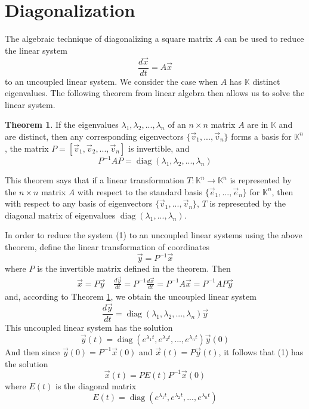 \documentclass[11pt]{book}
\theoremstyle{definition}\newtheorem{definition}[subsection]{Definition}
\theoremstyle{definition}\newtheorem{example}[subsection]{Example}
\theoremstyle{definition}\newtheorem{notation}[subsection]{Notation}
\theoremstyle{definition}\newtheorem{remark}[subsection]{Remark}
\theoremstyle{theorem}\newtheorem{theorem}[subsection]{Theorem}
\theoremstyle{theorem}\newtheorem{lemma}[subsection]{Lemma}
\theoremstyle{theorem}\newtheorem{proposition}[subsection]{Proposition}
\theoremstyle{theorem}\newtheorem{corollary}[subsection]{Corollary}
\theoremstyle{theorem}\newtheorem{case}{Case}
\theoremstyle{remark}\newtheorem{subcase}{Subcase}[case]
\newcommand{\K}{\mathbb{K}}
\DeclareMathOperator{\diag}{diag}
\begin{document}
\section{Diagonalization}

The algebraic technique of diagonalizing a square matrix $A$ can be used to reduce the linear system
\begin{equation*}
    \frac{d\vec{x}}{dt} = A\vec{x} \tag{1}
\end{equation*}
to an uncoupled linear system. We consider the case when $A$ has $\K$ distinct eigenvalues. The following theorem from linear algebra then allows us to solve the linear system.

\begin{theorem}\label{theorem:1.3.1}
    If the eigenvalues $\lambda_1, \lambda_2,..., \lambda_n$ of an $n \times n$ matrix $A$ are in $\K$ and are distinct, then any corresponding eigenvectors $\{\vec{v}_1,..., \vec{v}_n\}$ forms a basis for $\K^n$, the matrix $P = [\vec{v}_1, \vec{v}_2,..., \vec{v}_n]$ is invertible, and
    \begin{equation*}
        P^{-1}AP = \diag(\lambda_1, \lambda_2,..., \lambda_n)
    \end{equation*}
\end{theorem}

This theorem says that if a linear transformation $T : \K^n \to \K^n$ is represented by the $n \times n$ matrix $A$ with respect to the standard basis $\{\vec{e}_1,..., \vec{e}_n\}$ for $\K^n$, then with respect to any basis of eigenvectors $\{\vec{v}_1,..., \vec{v}_n\}$, $T$ is represented by the diagonal matrix of eigenvalues $\diag(\lambda_1,..., \lambda_n)$.

In order to reduce the system (1) to an uncoupled linear systems using the above theorem, define the linear transformation of coordinates
\begin{equation*}
    \vec{y} = P^{-1}\vec{x}
\end{equation*}
where $P$ is the invertible matrix defined in the theorem. Then
\begin{align*}
    \vec{x} = P\vec{y} \quad \frac{d\vec{y}}{dt} = P^{-1}\frac{d\vec{x}}{dt} = P^{-1}A\vec{x} = P^{-1}AP\vec{y}
\end{align*}
and, according to Theorem \ref{theorem:1.3.1}, we obtain the uncoupled linear system
\begin{equation*}
    \frac{d\vec{y}}{dt} = \diag(\lambda_1, \lambda_2,..., \lambda_n)\vec{y}
\end{equation*}
This uncoupled linear system has the solution
\begin{equation*}
    \vec{y}(t) = \diag(e^{\lambda_1t}, e^{\lambda_2t},..., e^{\lambda_nt})\vec{y}(0)
\end{equation*}
And then since $\vec{y}(0) = P^{-1}\vec{x}(0)$ and $\vec{x}(t) = P\vec{y}(t)$, it follows that (1) has the solution
\begin{equation*}
    \vec{x}(t) = PE(t)P^{-1}\vec{x}(0) \tag{2}
\end{equation*}
where $E(t)$ is the diagonal matrix
\begin{equation*}
    E(t) = \diag(e^{\lambda_1t}, e^{\lambda_2t},..., e^{\lambda_nt})
\end{equation*}
\end{document}
